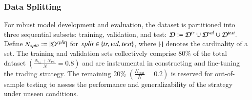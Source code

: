 \subsubsection*{Data Splitting}
For robust model development and evaluation, the dataset is partitioned into three sequential subsets: training, validation, and test:
$
\mathcal{D} := \mathcal{D}^{tr} \cup \mathcal{D}^{val} \cup \mathcal{D}^{test}.
$
Define $N_{split}:=|\mathcal{D}^{split}|$ for $split\in\left\{tr,val,test\right\}$, where $\left|\cdot\right|$ denotes the cardinality of a set. 
%
The training and validation sets collectively comprise 80\% of the total dataset $(\frac{N_{\text{tr}} + N_{\text{val}}}{N} = 0.8)$ and are instrumental in constructing and fine-tuning the trading strategy. The remaining 20\% $(\frac{N_{\text{test}}}{N} = 0.2)$ is reserved for out-of-sample testing to assess the performance and generalizability of the strategy under unseen conditions.
